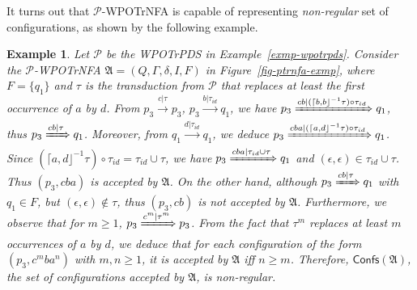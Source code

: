 \documentclass[preprint,12pt]{elsarticle}
\newtheorem{example}{Example}
\newcommand\Pp{{\mathcal{P} }}
\newcommand\confs{{\mathsf{Confs} }}
\newcommand\Aut{{\mathfrak{A} }}
\newcommand{\WOTrPDS}{\textsf{WPOTrPDS}}
\newcommand{\WOTrNFA}{\textsf{WPOTrNFA}}
\begin{document}
It turns out that $\Pp$-{\WOTrNFA} is capable of representing \emph{non-regular} set of configurations, as %
shown by the following example.
\begin{example}
Let $\Pp$ be the {\WOTrPDS} in Example~\ref{exmp-wpotrpds}. Consider the $\Pp$-{\WOTrNFA} $\Aut = (Q, \Gamma, \delta, I, F)$ in Figure~\ref{fig-ptrnfa-exmp}, where $F= \{q_1\}$ and $\tau$ is the transduction from $\Pp$ that replaces at least the first occurrence of $a$ by $d$. From $p_3 \xrightarrow{c | \tau} p_3$, $p_3 \xrightarrow{b | \tau_{id}} q_1$, we have $p_3  \xRightarrow{c b | (\lceil b, b\rfloor^{-1} \tau) \circ \tau_{id}} q_1$, thus $p_3 \xRightarrow{cb | \tau} q_1$. Moreover, from $q_1 \xrightarrow{d | \tau_{id}} q_1$, we deduce $p_3 \xRightarrow{c b a | (\lceil a, d\rfloor^{-1} \tau) \circ \tau_{id}} q_1$. Since $(\lceil a, d\rfloor^{-1} \tau) \circ \tau_{id} = \tau_{id} \cup \tau$, we have $p_3 \xRightarrow{c b a |  \tau_{id} \cup \tau} q_1$ and $(\epsilon, \epsilon) \in \tau_{id} \cup \tau$. Thus $(p_3, cba)$ is accepted by $\Aut$. On the other hand, although $p_3 \xRightarrow{cb | \tau} q_1$ with $q_1 \in F$, but $(\epsilon, \epsilon) \not \in \tau$, thus $(p_3, cb)$ is not accepted by $\Aut$.  Furthermore, we observe that for $m \ge 1$, $p_3 \xRightarrow{c^m | \tau^m} p_3$. From the fact that $\tau^m$ replaces at least $m$ occurrences of $a$ by $d$, we deduce that for each configuration of the form $(p_3, c^m b a^n)$ with $m,n \ge 1$, it is accepted by $\Aut$ iff $n \ge m$.  Therefore, $\confs(\Aut)$, the set of configurations accepted by $\Aut$, is non-regular. 
%
\begin{figure}[htb]
    \centering

\end{figure}
\end{example}
\end{document}
